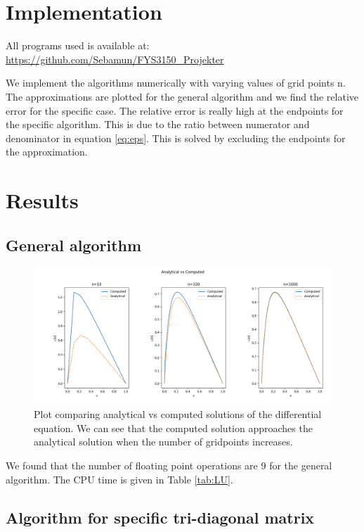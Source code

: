 \documentclass[norsk,a4paper,12pt]{article}
\begin{document}
\section{Implementation}

All programs used is available at: \\
\url{https://github.com/Sebamun/FYS3150_Projekter}

We implement the algorithms numerically with varying values of grid points n. The approximations are plotted for the general algorithm and we find the relative error for the specific case. The relative error is really high at the endpoints for the specific algorithm. This is due to the ratio between numerator and denominator in equation \ref{eq:eps}. This is solved by excluding the endpoints for the approximation. 

\section{Results}

\subsection{General algorithm}

\begin{figure}[H]
	\centering
	\includegraphics[width=\linewidth]{1b.png}
	\caption{Plot comparing analytical vs computed solutions of the differential equation. We can see that the computed solution approaches the analytical solution when the number of gridpoints increases.}
	\label{fig:1bplot}
\end{figure}

We found that the number of floating point operations are 9 for the general algorithm. The CPU time is given in Table \ref{tab:LU}.

\subsection{Algorithm for specific tri-diagonal matrix}
\end{document}
